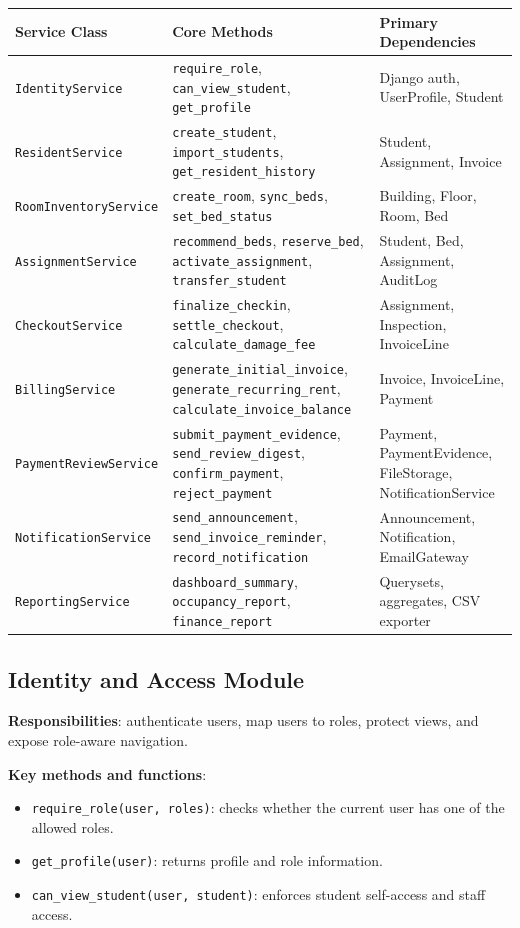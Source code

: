 \documentclass[11pt,a4paper]{article}
\begin{document}
\begin{longtable}{L{0.28\textwidth} L{0.33\textwidth} L{0.26\textwidth}}
\toprule
\textbf{Service Class} & \textbf{Core Methods} & \textbf{Primary Dependencies}\\
\midrule
\endhead
\texttt{IdentityService} & \texttt{require\_role}, \texttt{can\_view\_student}, \texttt{get\_profile} & Django auth, UserProfile, Student\\
\texttt{ResidentService} & \texttt{create\_student}, \texttt{import\_students}, \texttt{get\_resident\_history} & Student, Assignment, Invoice\\
\texttt{RoomInventoryService} & \texttt{create\_room}, \texttt{sync\_beds}, \texttt{set\_bed\_status} & Building, Floor, Room, Bed\\
\texttt{AssignmentService} & \texttt{recommend\_beds}, \texttt{reserve\_bed}, \texttt{activate\_assignment}, \texttt{transfer\_student} & Student, Bed, Assignment, AuditLog\\
\texttt{CheckoutService} & \texttt{finalize\_checkin}, \texttt{settle\_checkout}, \texttt{calculate\_damage\_fee} & Assignment, Inspection, InvoiceLine\\
\texttt{BillingService} & \texttt{generate\_initial\_invoice}, \texttt{generate\_recurring\_rent}, \texttt{calculate\_invoice\_balance} & Invoice, InvoiceLine, Payment\\
\texttt{PaymentReviewService} & \texttt{submit\_payment\_evidence}, \texttt{send\_review\_digest}, \texttt{confirm\_payment}, \texttt{reject\_payment} & Payment, PaymentEvidence, FileStorage, NotificationService\\
\texttt{NotificationService} & \texttt{send\_announcement}, \texttt{send\_invoice\_reminder}, \texttt{record\_notification} & Announcement, Notification, EmailGateway\\
\texttt{ReportingService} & \texttt{dashboard\_summary}, \texttt{occupancy\_report}, \texttt{finance\_report} & Querysets, aggregates, CSV exporter\\
\bottomrule
\end{longtable}

\subsection{Identity and Access Module}
\textbf{Responsibilities}: authenticate users, map users to roles, protect views, and expose role-aware navigation.

\textbf{Key methods and functions}:
\begin{itemize}
  \item \texttt{require\_role(user, roles)}: checks whether the current user has one of the allowed roles.
  \item \texttt{get\_profile(user)}: returns profile and role information.
  \item \texttt{can\_view\_student(user, student)}: enforces student self-access and staff access.
\end{itemize}
\end{document}
